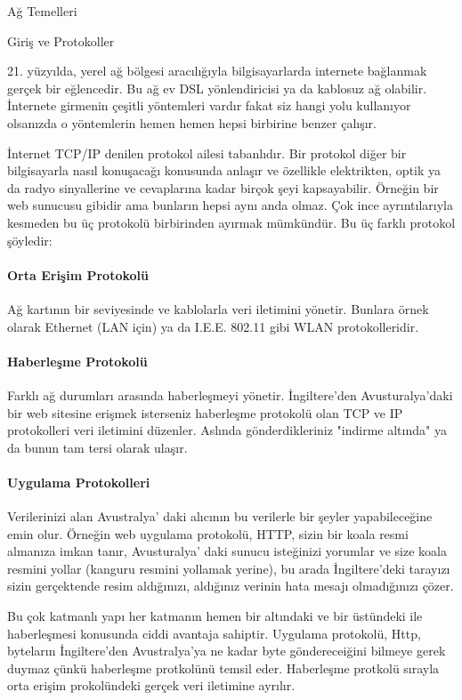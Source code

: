 \begin{section}{Ağ Temelleri}
\begin{subsection}{Giriş ve Protokoller}

21. yüzyılda, yerel ağ bölgesi aracılığıyla bilgisayarlarda internete bağlanmak gerçek bir eğlencedir. Bu ağ ev DSL yönlendiricisi ya da kablosuz ağ olabilir.
İnternete girmenin çeşitli yöntemleri vardır fakat siz hangi yolu kullanıyor olsanızda o yöntemlerin hemen hemen hepsi birbirine benzer çalışır.

İnternet TCP/IP denilen protokol ailesi tabanlıdır. Bir protokol diğer bir bilgisayarla nasıl konuşacağı konusunda anlaşır ve özellikle elektrikten, optik ya da radyo sinyallerine ve cevaplarına kadar birçok şeyi kapsayabilir. Örneğin bir web sunucusu gibidir ama bunların hepsi aynı anda olmaz. Çok ince ayrıntılarıyla kesmeden bu üç protokolü birbirinden ayırmak mümkündür. Bu üç farklı protokol şöyledir:

\paragraph{Orta Erişim Protokolü}{Ağ kartının bir seviyesinde ve kablolarla veri iletimini yönetir. Bunlara örnek olarak Ethernet (LAN için) ya da I.E.E. 802.11 gibi WLAN protokolleridir.} 

\paragraph{Haberleşme Protokolü}{Farklı ağ durumları arasında haberleşmeyi yönetir. İngiltere'den Avusturalya'daki bir web sitesine erişmek isterseniz haberleşme protokolü olan TCP ve IP protokolleri veri iletimini düzenler. Aslında gönderdikleriniz "indirme altında" ya da bunun tam tersi olarak ulaşır.}

\paragraph{Uygulama Protokolleri}{Verilerinizi alan Avustralya' daki alıcının bu verilerle bir şeyler yapabileceğine emin olur. Örneğin web uygulama protokolü, HTTP, sizin bir koala resmi almanıza imkan tanır, Avusturalya' daki sunucu isteğinizi yorumlar ve size koala resmini yollar (kanguru resmini yollamak yerine), bu arada İngiltere'deki tarayızı sizin gerçektende resim aldığınızı, aldığınız verinin hata mesajı olmadığınızı çözer.}

Bu çok katmanlı yapı her katmanın hemen bir altındaki ve bir üstündeki ile haberleşmesi konusunda ciddi avantaja sahiptir. Uygulama protokolü, Http, byteların İngiltere'den Avustralya'ya ne kadar byte göndereceiğini bilmeye gerek duymaz çünkü haberleşme protkolünü temsil eder. Haberleşme protkolü sırayla orta erişim prokolündeki gerçek veri iletimine ayrılır.


\end{subsection}
\end{section}
